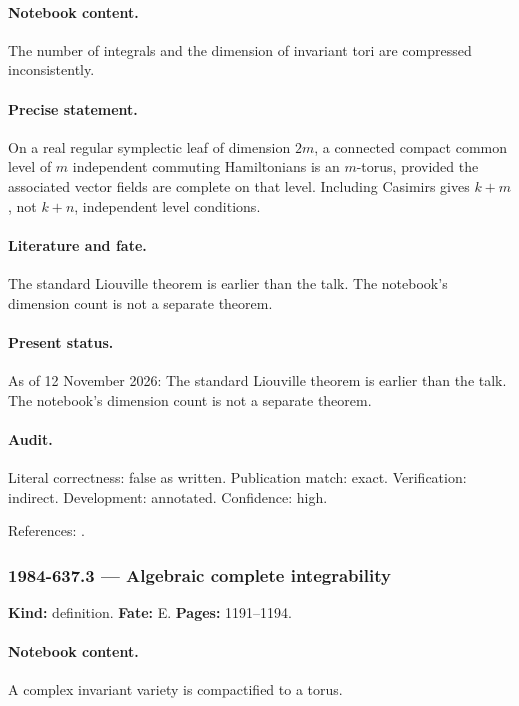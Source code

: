 \paragraph{Notebook content.} The number of integrals and the dimension of invariant tori are compressed inconsistently.

\paragraph{Precise statement.} On a real regular symplectic leaf of dimension \(2m\), a connected compact common level of \(m\) independent commuting Hamiltonians is an \(m\)-torus, provided the associated vector fields are complete on that level. Including Casimirs gives \(k+m\), not \(k+n\), independent level conditions.

\paragraph{Literature and fate.} The standard Liouville theorem is earlier than the talk. The notebook's dimension count is not a separate theorem.

\paragraph{Present status.} As of 12 November 2026: The standard Liouville theorem is earlier than the talk. The notebook's dimension count is not a separate theorem.

\paragraph{Audit.} Literal correctness: false as written. Publication match: exact. Verification: indirect. Development: annotated. Confidence: high.

\noindent References: \citep{adler1982kowalewski}.\par

\subsubsection{1984-637.3 --- Algebraic complete integrability}

\label{item:1984-637.3}

\noindent\textbf{Kind:} definition. \textbf{Fate:} E. \textbf{Pages:} 1191--1194.\par

\paragraph{Notebook content.} A complex invariant variety is compactified to a torus.

